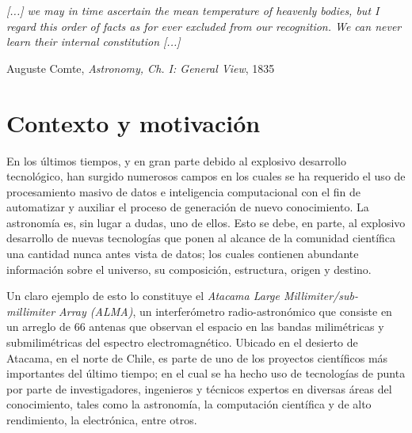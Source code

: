 \begin{intro}


\vspace{1em}
\hfill{}
\begin{minipage}{9cm}{
\begin{spacing}{0.9}
\small
\noindent
\textit{[...] we may in time ascertain the mean temperature of heavenly bodies, but I regard this order of facts as for ever excluded from our recognition. We can never learn their internal constitution [...]}
\end{spacing}
\vspace{1em}
\hfill{}{Auguste Comte, \textit{Astronomy, Ch. I: General View}, 1835}
}
\vspace{2em}
\end{minipage}

\section*{Contexto y motivación}

En los últimos tiempos, y en gran parte debido al explosivo desarrollo tecnológico, han surgido numerosos campos en los cuales se ha requerido el uso de procesamiento masivo de datos e inteligencia computacional con el fin de automatizar y auxiliar el proceso de generación de nuevo conocimiento. La astronomía es, sin lugar a dudas, uno de ellos. Esto se debe, en parte, al explosivo desarrollo de nuevas tecnologías que ponen al alcance de la comunidad científica una cantidad nunca antes vista de datos; los cuales contienen abundante información sobre el universo, su composición, estructura, origen y destino.

Un claro ejemplo de esto lo constituye el \textit{Atacama Large Millimiter/sub-millimiter Array (ALMA)}\cite{wootten2009atacama}, un interferómetro radio-astronómico que consiste en un arreglo de 66 antenas que observan el espacio en las bandas milimétricas y submilimétricas del espectro electromagnético. Ubicado en el desierto de Atacama, en el norte de Chile, es parte de uno de los proyectos científicos más importantes del último tiempo; en el cual se ha hecho uso de tecnologías de punta por parte de investigadores, ingenieros y técnicos expertos en diversas áreas del conocimiento, tales como la astronomía, la computación científica y de alto rendimiento, la electrónica, entre otros.


\end{intro}

